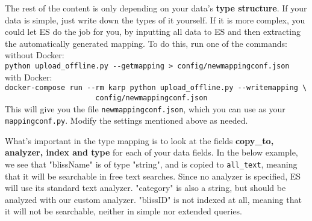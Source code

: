 \documentclass[
12pt, %
a4paper, %
oneside, %
headinclude,footinclude, %
BCOR0mm, %
]{scrartcl}
\begin{document}
   The rest of the content is only depending on your data's \textbf{type structure}.
   If your data is simple, just write down the types of it yourself. If it is
   more complex, you could let ES do the job for you,  by inputting all data to ES and
   then extracting the automatically generated mapping.
   To do this, run one of the commands:\\
   without Docker:\\
   \verb|python upload_offline.py --getmapping > config/newmappingconf.json|\\
   with Docker:\\
  \verb|docker-compose run --rm karp python upload_offline.py --writemapping \|\\
  \verb|                     config/newmappingconf.json|\\
   This will give you the file \verb|newmappingconf.json|, which you can use
   as your \verb|mappingconf.py|. Modify the settings mentioned above as needed.

   What's important in the type mapping is to look at the fields \textbf{copy\_to, analyzer, index and
   type} for each of your data fields.
   In the below example, we see that "blissName" is of type
   "string", and is copied to \verb"all_text", meaning that it will be searchable in free text searches.
   Since no analyzer is specified, ES will use its standard text analyzer.
   "category" is also a string, but should be analyzed with our custom analyzer.
   "blissID" is not indexed at all, meaning that it will not be searchable, neither in simple nor
   extended queries.
\end{document}
